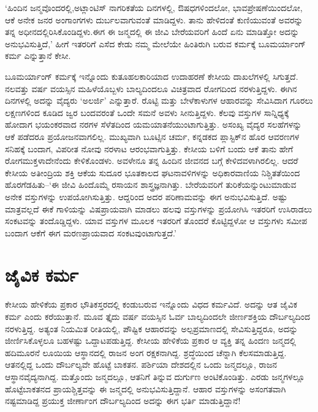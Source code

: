 ‘ಹಿಂದಿನ ಜನ್ಮವೊಂದರಲ್ಲಿ,ಅಟ್ಲಾಂಟಿಸ್ ನಾಗರಿಕತೆಯ ದಿನಗಳಲ್ಲಿ, ಔಷಧಗಳಿಂದಲೋ, ಭಾವಪ್ರೇಷಣೆಯಿಂದಲೋ, ಆಕೆ ಅನೇಕ ಜನರ ಅಂಗಾಂಗಗಳು ದುರ್ಬಲವಾಗುವಂತೆ ಮಾಡಿ\-ದ್ದಳು. ತಾನು ಹೇಳಿದಂತೆ ಕುಣಿಯುವಂತೆ ಅವರನ್ನು ತನ್ನ ಅಧೀನದಲ್ಲಿರಿಸಿಕೊಂಡಿದ್ದಳು.\break ಈಗ ಈ ಜನ್ಮದಲ್ಲಿ ಈ ಜೀವಿ ಬೇರೆಯವರಿಗೆ ಹಿಂದೆ ಏನು ಮಾಡಿತ್ತೋ ಅದನ್ನು ಅನುಭವಿಸುತ್ತಿದೆ,’ ಹೀಗೆ ಇತರರಿಗೆ ಎಸೆದ ಕೇಡು ನಮ್ಮ ಮೇಲೆಯೇ ಹಿಂತಿರುಗಿ ಬರುವ ಕರ್ಮಕ್ಕೆ ಬೂಮರ್ಯಾಂಗ್ ಕರ್ಮ  ಎನ್ನುತ್ತಾನೆ ಕೇಸೀ.

ಬೂಮರ್ಯಾಂಗ್ ಕರ್ಮಕ್ಕೆ ಇನ್ನೊಂದು ಕುತೂಹಲಕಾರಿಯಾದ ಉದಾಹರಣೆ ಕೇಸೀಯ ದಾಖಲೆಗಳಲ್ಲಿ ಸಿಗುತ್ತದೆ. ನಲವತ್ತು ವರ್ಷ ವಯಸ್ಸಿನ ಮಹಿಳೆಯೊಬ್ಬಳು ಬಾಲ್ಯದಿಂದಲೂ ವಿಚಿತ್ರವಾದ ರೋಗದಿಂದ ನರಳುತ್ತಿದ್ದಳು. ಈಗಿನ ದಿನಗಳಲ್ಲಿ ಅದನ್ನು ವೈದ್ಯರು ‘ಅಲರ್ಜಿ’ ಎನ್ನುತ್ತಾರೆ. ರೊಟ್ಟಿ ಮತ್ತು ಬೇಳೆಕಾಳುಗಳ ಆಹಾರವನ್ನು ಸೇವಿಸಿದಾಗ ಗೂರಲು ಲಕ್ಷಣಗಳಿಂದ ಕೂಡಿದ ಜ್ವರ ಬಂದವರಂತೆ ಒಂದೇ ಸಮನೆ ಅವಳು ಸೀನುತ್ತಿದ್ದಳು. ಕೆಲವು ವಸ್ತುಗಳ ಸಾನ್ನಿಧ್ಯಕ್ಕೆ ಹೋದಾಗ ಭಯಂಕರವಾದ ನರಗಳ ಸೆಳೆತದಿಂದ ಯಮಯಾತನೆಯುಂಟಾಗುತ್ತಿತ್ತು. ಅಸಂಖ್ಯ ವೈದ್ಯರ ಸಲಹೆಗಳನ್ನು ಆಕೆ ಪಡೆದರೂ ಪ್ರಯೋಜನವಾಗಲಿಲ್ಲ. ಮುಖ್ಯವಾಗಿ ಬೂಟ್ಸಿನ ಚರ್ಮ, ಕನ್ನಡಕದ ಪ್ಲಾಸ್ಟಿಕ್​ನ ಹೊರ ಆವರಣಗಳ ಸನಿಹಕ್ಕೆ ಬಂದಾಗ, ವಿಪರೀತ ನೋವು ನರಳಾಟ ಆರಂಭವಾಗುತ್ತಿತ್ತು. ಕೇಸೀಯ ಬಳಿಗೆ ಬಂದು ಆಕೆ ತಾನು ಹೇಗೆ ರೋಗಮುಕ್ತಳಾದೇನೆಂದು ಕೇಳಿಕೊಂಡಳು. ಅವಳೇನೂ ತನ್ನ ಹಿಂದಿನ ಜೀವನದ ಬಗ್ಗೆ ಕೇಳಿದವಳಾಗಿರಲಿಲ್ಲ. ಆದರೆ ಕೇಸೀಯ ಅತೀಂದ್ರಿಯ ಶಕ್ತಿ ಆಕೆಯ ಸುದೂರ ಭೂತಕಾಲದ ಘಟನಾವಳಿಗಳನ್ನು ಅಧಿಕಾರವಾಣಿಯ ನಿಶ್ಚಿತತೆಯಿಂದ ಹೊರಗೆಡಹಿತು–‘ಈ ಜೀವಿ ಹಿಂದೊಮ್ಮೆ ರಸಾಯನ ಶಾಸ್ತ್ರಜ್ಞನಾಗಿತ್ತು. ಬೇರೆಯವರಿಗೆ ತುರಿಕೆಯನ್ನುಂಟುಮಾಡುವ ಅನೇಕ ವಸ್ತುಗಳನ್ನು ಉಪಯೋಗಿಸುತ್ತಿತ್ತು. ಆದ್ದರಿಂದ ಅದರ ಪರಿಣಾಮವನ್ನು ಈಗ ಅನುಭವಿಸುತ್ತಿದೆ. ಅಷ್ಟು ಮಾತ್ರವಲ್ಲದೆ ಈಕೆ ಗಾಳಿಯನ್ನು ವಿಷಪ್ರಾಯವಾಗಿ ಮಾಡಲು ಹಲವು ವಸ್ತುಗಳನ್ನು ಪ್ರಯೋಗಿಸಿ ಇತರರಿಗೆ ಉಸಿರಾಡಲು ಸಂಕಟವನ್ನು ತಂದೊಡ್ಡಿದ್ದಳು. ಯಾವ ವಸ್ತುಗಳ ಮೂಲಕ ಇತರರಿಗೆ ತೊಂದರೆ ಕೊಟ್ಟಿದ್ದಳೋ ಆ ವಸ್ತುಗಳು ಸಮೀಪ ಬಂದಾಗ ಆಕೆಗೆ ಈಗ ಮರಣಪ್ರಾಯವಾದ ಸಂಕಟವುಂಟಾಗುತ್ತದೆ.’


\section*{ಜೈವಿಕ ಕರ್ಮ}


ಕೇಸೀಯ ಹೇಳಿಕೆಯ ಪ್ರಕಾರ ಭೌತಿಕಸ್ತರದಲ್ಲಿ ಕಂಡುಬರುವ ಇನ್ನೊಂದು ವಿಧದ ಕರ್ಮವಿದೆ. ಅದನ್ನು ಆತ ಜೈವಿಕ ಕರ್ಮ  ಎಂದು ಕರೆಯುತ್ತಾನೆ. ಮೂವ ತ್ತೈದು ವರ್ಷ ವಯಸ್ಸಿನ ಓರ್ವ ಬಾಲ್ಯದಿಂದಲೇ ಜೀರ್ಣಶಕ್ತಿಯ ದೌರ್ಬಲ್ಯದಿಂದ ನರಳುತ್ತಿದ್ದ. ಅತ್ಯಂತ ನಿಯಮಿತ ರೀತಿಯಲ್ಲಿ, ಪೌಷ್ಟಿಕ ಆಹಾರವನ್ನು ಅಲ್ಪಪ್ರಮಾಣದಲ್ಲಿ ಸೇವಿಸುತ್ತಿದ್ದರೂ, ಅದನ್ನು ಜೀರ್ಣಿಸಿಕೊಳ್ಳಲೂ ಬಹಳಷ್ಟು ಒದ್ದಾಟಪಡುತ್ತಿದ್ದ. ಕೇಸೀಯ ಹೇಳಿಕೆಯ ಪ್ರಕಾರ ಆ ವ್ಯಕ್ತಿ ತನ್ನ ಹಿಂದಣ ಜನ್ಮದಲ್ಲಿ ಹದಿಮೂರನೆ ಲೂಯಿಯ ಆಸ್ಥಾನದಲ್ಲಿ ರಾಜನ ಅಂಗ ರಕ್ಷಕನಾಗಿದ್ದ. ಶ್ರದ್ಧೆಯಿಂದ ಚೆನ್ನಾಗಿ ಕೆಲಸಮಾಡುತ್ತಿದ್ದ. ಆತನಲ್ಲಿದ್ದ ಒಂದು ದೌರ್ಬಲ್ಯವೇ ಹೊಟ್ಟೆ ಬಾಕತನ. ಪರ್ಶಿಯಾ ದೇಶದಲ್ಲಿನ ಒಂದು ಜನ್ಮದಲ್ಲೂ, ರಾಜನ ಆಸ್ಥಾನವೈದ್ಯನಾಗಿದ್ದ. ಮತ್ತೊಂದು ಜನ್ಮದಲ್ಲೂ, ಆತನಿಗೆ ತಿನ್ನುವ ದುರ್ಗುಣ ಅಂಟಿಕೊಂಡಿತ್ತು. ಎರಡು ಜನ್ಮಗಳಲ್ಲೂ ಹೊಟ್ಟೆಬಾಕತನದ ಪ್ರಾಯಶ್ಚಿತ್ತವನ್ನು ಈ ಜನ್ಮದಲ್ಲಿ ಅನುಭವಿಸುತ್ತಿದ್ದಾನೆ. ಆಹಾರ ವಸ್ತುಗಳನ್ನು ಅಸಂಗತವಾಗಿ ನಷ್ಟಮಾಡಿದ್ದ ಪ್ರಯುಕ್ತ ಜೀರ್ಣಾಂಗ ದೌರ್ಬಲ್ಯದಿಂದ ಅದನ್ನು ಈಗ ಭರ್ತಿ ಮಾಡುತ್ತಿದ್ದಾನೆ!


